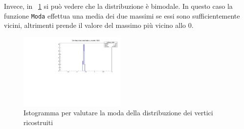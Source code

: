 \documentclass[11pt,a4paper]{article}
\begin{document}
\noindent Invece, in \figurename~\ref{istoModaMedio} si può vedere che la distribuzione è bimodale. In questo caso la funzione \lstinline{Moda} effettua una media dei due massimi se essi sono sufficientemente vicini, altrimenti prende il valore del massimo più vicino allo 0.
\begin{figure}[h!]
    \centering
    \includegraphics[width=0.47\textwidth]{Immagini/hzReco_medio_1000.pdf}
    \caption{Istogramma per valutare la moda della distribuzione dei vertici ricostruiti}
    \label{istoModaMedio}
\end{figure}
\end{document}
